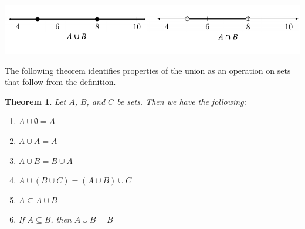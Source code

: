 \documentclass[
]{book}
\newtheorem{theorem}{Theorem}[chapter]
\theoremstyle{definition}
\theoremstyle{definition}
\theoremstyle{definition}
\theoremstyle{remark}
\begin{document}
\begin{center}\includegraphics[width=0.95\linewidth]{tikz/number-line-unions} \end{center}

The following theorem identifies properties of the union as an operation on sets that follow from the definition.

\begin{theorem}
\protect\hypertarget{thm:unnamed-chunk-18}{}{\label{thm:unnamed-chunk-18} }Let \(A\), \(B\), and \(C\) be sets. Then we have the following:

\begin{enumerate}
\def\labelenumi{\arabic{enumi}.}
\item
  \(A\cup \emptyset = A\)
\item
  \(A \cup A = A\)
\item
  \(A \cup B = B \cup A\)
\item
  \(A \cup (B\cup C ) = (A\cup B) \cup C\)
\item
  \(A \subseteq A \cup B\)
\item
  If \(A \subseteq B\), then \(A\cup B=B\)
\end{enumerate}
\end{theorem}
\end{document}
